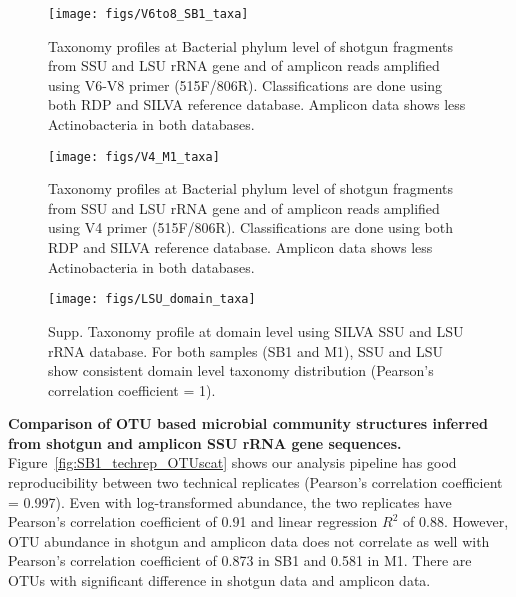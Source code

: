 \documentclass[12pt]{article}
\begin{document}
\begin{figure}[tbph!]
  \centering
  \texttt{[image: figs/V6to8\_SB1\_taxa]}

  \caption[Taxonomy profiles at Bacterial phylum level of shotgun
  fragments and of amplicon reads amplified using V6-V8
  primer]{Taxonomy profiles at Bacterial phylum level of shotgun
  fragments from SSU and LSU rRNA gene and of amplicon reads amplified
  using V6-V8 primer (515F/806R). Classifications are done using both
  RDP and SILVA reference database. Amplicon data shows less
  Actinobacteria in both databases.}

  \label{fig:V6to8_SB1_taxa}
\end{figure}

\begin{figure}[tbph!]
  \centering
  \texttt{[image: figs/V4\_M1\_taxa]}

  \caption[Taxonomy profiles at Bacterial phylum level of shotgun
  fragments and of amplicon reads amplified using V4 primer]{Taxonomy
  profiles at Bacterial phylum level of shotgun fragments from SSU and
  LSU rRNA gene and of amplicon reads amplified using V4 primer
  (515F/806R). Classifications are done using both RDP and SILVA
  reference database. Amplicon data shows less Actinobacteria in both
  databases.}

  \label{fig:V4_M1_taxa}
\end{figure}

\begin{figure}[tbph!]
  \centering
  \texttt{[image: figs/LSU\_domain\_taxa]}

  \caption[Taxonomy profile at domain level using SILVA SSU and LSU
  rRNA database]{Supp. Taxonomy profile at domain level using SILVA
  SSU and LSU rRNA database. For both samples (SB1 and M1), SSU and
  LSU show consistent domain level taxonomy distribution (Pearson's
  correlation coefficient = 1).}

  \label{fig:LSU_domain_taxa}
\end{figure}


{\bf Comparison of OTU based microbial community structures inferred
from shotgun and amplicon SSU rRNA gene sequences. }
Figure~\ref{fig:SB1_techrep_OTUscat} shows our analysis pipeline has
good reproducibility between two technical replicates (Pearson's
correlation coefficient = 0.997). Even with log-transformed abundance,
the two replicates have Pearson's correlation coefficient of 0.91 and
linear regression $R^2$ of 0.88. However, OTU abundance in shotgun and
amplicon data does not correlate as well with Pearson's correlation
coefficient of 0.873 in SB1 and 0.581 in M1. There are OTUs with
significant difference in shotgun data and amplicon data.
\end{document}
